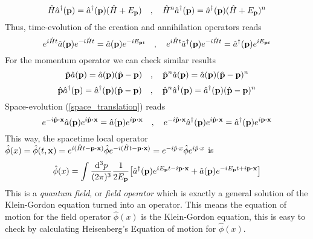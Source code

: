 \begin{equation}
    \hat{H}\hat{a}^\dagger(\vb{p})=\hat{a}^\dagger(\vb{p})(\hat{H}+E_{\vb{p}})\quad,\quad \hat{H}^n\hat{a}^\dagger(\vb{p})=\hat{a}^\dagger(\vb{p})(\hat{H}+E_{\vb{p}})^n
\end{equation}
Thus, time-evolution of the creation and annihilation operators reads
\begin{equation}
    e^{i\hat{H}t}\hat{a}(\vb{p})  e^{-i\hat{H}t}=\hat{a}(\vb{p})  e^{-iE_{\vb{p}t}}\quad, \quad e^{i\hat{H}t}\hat{a}^\dagger(\vb{p})  e^{-i\hat{H}t}=\hat{a}^\dagger(\vb{p})  e^{iE_{\vb{p}t}}
\end{equation}
For the momentum operator we can check similar results\cite{peskin1995introduction}
\begin{equation}
    \hat{\vb{p}}\hat{a}(\vb{p})=\hat{a}(\vb{p})(\hat{\vb{p}}-\vb{p})\quad,\quad \hat{\vb{p}}^n\hat{a}(\vb{p})=\hat{a}(\vb{p})(\hat{\vb{p}}-\vb{p})^n
\end{equation}
\begin{equation}
    \hat{\vb{p}}\hat{a}^\dagger(\vb{p})=\hat{a}^\dagger(\vb{p})(\hat{\vb{p}}-\vb{p})\quad,\quad \hat{\vb{p}}^n\hat{a}^\dagger(\vb{p})=\hat{a}^\dagger(\vb{p})(\hat{\vb{p}}-\vb{p})^n
\end{equation}
Space-evolution (\ref{space_translation}) reads
\begin{equation}
    e^{-i\hat{\vb{p}}\vdot\vb{x}}\hat{a}(\vb{p})  e^{i\hat{\vb{p}}\vdot\vb{x}}=\hat{a}(\vb{p})  e^{i{\vb{p}\vdot\vb{x}}}\quad,\quad e^{-i\hat{\vb{p}}\vdot\vb{x}}\hat{a}^\dagger(\vb{p})  e^{i\hat{\vb{p}}\vdot\vb{x}}=\hat{a}^\dagger(\vb{p})  e^{i{\vb{p}\vdot\vb{x}}}
\end{equation}
This way, the spacetime local operator $\hat{\phi}(x)=\hat{\phi}(t,\vb{x})=e^{i(\hat{H}t-\vb{p}\vdot\vb{x})}\hat{\phi}e^{-i(\hat{H}t-\vb{p}\vdot\vb{x})}=e^{-i\hat{p}\cdot x}\hat{\phi}e^{i\hat{p}\cdot x}$ is
\begin{equation}
    \hat{\phi}(x)=\int\frac{\dd^3p}{(2\pi)^3}\frac{1}{2E_{\vb{p}}}\qty[\hat{a}^\dagger(\vb{p})e^{iE_{\vb{p}}t-i\vb{p}\vdot\vb{x}}+\hat{a}(\vb{p})e^{-iE_{\vb{p}}t+i\vb{p}\vdot\vb{x}}]
    \label{general_mode_expansion}
\end{equation}
This is a \textit{quantum field}, or \textit{field operator} which is exactly a general solution of the Klein-Gordon equation turned into an operator. This means the equation of motion for the field operator $\hat{\phi}(x)$ is the Klein-Gordon equation, this is easy to check by calculating Heisenberg's Equation of motion for $\hat{\phi}(x)$.\\

